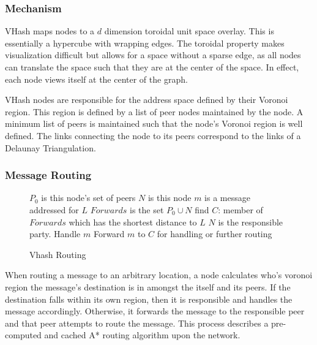 \documentclass{article}
\begin{document}
\subsubsection*{Mechanism}
VHash maps nodes to a $d$ dimension toroidal unit space overlay. This is essentially a hypercube with wrapping edges. The toroidal property makes visualization difficult but allows for a space without a sparse edge, as all nodes can translate the space such that they are at the center of the space.  In effect, each node views itself at the center of the graph.

VHash nodes are responsible for the address space defined by their Voronoi region. This region is defined by a list of peer nodes maintained by the node. A minimum list of peers is maintained such that the node's Voronoi region is well defined. The links connecting the node to its peers correspond to the links of a Delaunay Triangulation.

\subsubsection*{Message Routing}


\begin{wrapfigure}{l}{0.5\textwidth}
\begin{minipage}{0.5\textwidth}
\begin{algorithm}[H]
\caption{Vhash Routing}
\label{routing}
{\footnotesize
\begin{algorithmic}[1]  %
	\STATE $P_0$ is this node's set of peers
    \STATE $N$ is this node
	\STATE $m$ is a message addressed for $L$
    \STATE $Forwards$ is the set $P_0\cup{}N$
    \STATE find $C$: member of $Forwards$ which has the shortest distance to $L$
    	\STATE $N$ is the responsible party.
        \STATE Handle $m$
    \ELSE
    	\STATE Forward $m$ to $C$ for handling or further routing
    \ENDIF
\end{algorithmic}
}
\end{algorithm}
\end{minipage}
\end{wrapfigure}


  
When routing a message to an arbitrary location, a node calculates who's voronoi region the message's destination is in amongst the itself and its peers. If the destination falls within its own region, then it is responsible and handles the message accordingly. Otherwise, it forwards the message to the responsible peer and that peer attempts to route the message. This process describes a pre-computed and cached A*\citep{astar} routing algorithm upon the network. 
\end{document}
